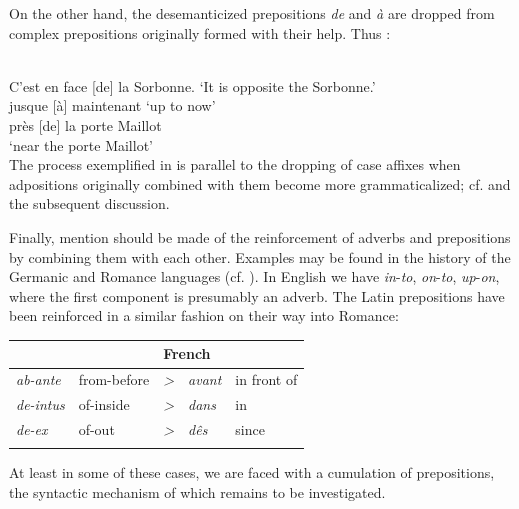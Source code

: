 \noindent On the other hand, the desemanticized prepositions \textit{de} and \textit{à} are dropped from complex prepositions originally formed with their help. Thus \citep[123]{Frei1929}:

\ea\label{ex:E77}
\langinfo{\LangFren}{}{} \\
\ea  C'est en face [de] la Sorbonne.
\glt ‘It is opposite the Sorbonne.’\\
\ex  jusque [à] maintenant
\glt ‘up to now’\\
\ex  près [de] la porte Maillot\\
\glt ‘near the porte Maillot’\\
\z
\z
\noindent The process exemplified in  is parallel to the dropping of case affixes when adpositions originally combined with them become more grammaticalized; cf.  and the subsequent discussion.

Finally, mention should be made of the reinforcement of adverbs and prepositions by combining them with each other. Examples may be found in the history of the Germanic and Romance languages (cf. \citealt[41]{Kahr1975}). In English we have \textit{in}{}-\textit{to}, \textit{on}{}-\textit{to}, \textit{up}{}-\textit{on}, where the first component is presumably an adverb. The Latin prepositions have been reinforced in a similar fashion on their way into Romance:

\begin{table}
\begin{tabular}{lllll}
\lsptoprule
\multicolumn{2}{l}{Vulgar Latin} &  & \multicolumn{2}{l}{French}\\
\midrule
\itshape ab-ante & from-before & \itshape {\textgreater} & \itshape avant & in front of\\
\itshape de-intus & of-inside & \itshape {\textgreater} & \itshape dans & in\\
\itshape de-ex & of-out & \itshape {\textgreater} & \itshape dês & since\\
\lspbottomrule
\end{tabular}
\end{table}

At least in some of these cases, we are faced with a cumulation of prepositions, the syntactic mechanism of which remains to be investigated.

